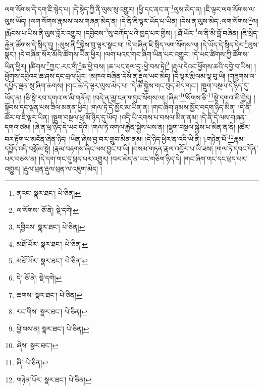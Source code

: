ལག་སོགས་དེ་དག་ཇི་སྙེད་པ། །དེ་སྙེད་ཀྱི་ནི་ལུས་སུ་འགྱུར། །ཕྱི་དང་ནང་ན་\footnote{ནའང་  སྣར་ཐང་།  པེ་ཅིན། }ལུས་མེད་ན། །ཇི་ལྟར་ལག་སོགས་ལ་ལུས་ཡོད། །ལག་སོགས་རྣམས་ལས་གཞན་མེད་ན། །དེ་ནི་ཇི་ལྟར་ཡོད་པ་ཡིན། །དེས་ན་ལུས་མེད་:ལག་སོགས་\footnote{ལ་སོགས་  ཅོ་ནེ།  སྡེ་དགེ། }ལ། །རྨོངས་པ་ཡིས་ནི་ལུས་བློར་འགྱུར། །དབྱིབས་\footnote{དབྱིངས་  སྣར་ཐང་།  པེ་ཅིན། }སུ་བཀོད་པའི་ཁྱད་པར་གྱིས། །:ཐོ་ཡོར་\footnote{མཐོ་ཡོར་  སྣར་ཐང་།  པེ་ཅིན། }ལ་ནི་མི་བློ་བཞིན། །ཇི་སྲིད་རྐྱེན་ཚོགས་དེ་སྲིད་དུ། །:ལུས་ནི་\footnote{མཐོ་ཡོར་  སྣར་ཐང་།  པེ་ཅིན། }སྐྱེས་བུ་ལྟར་སྣང་བ། །དེ་བཞིན་ཇི་སྲིད་ལག་སོགས་ལ། །དེ་ཡོད་དེ་སྲིད་དེར་\footnote{དེ་  ཅོ་ནེ།  སྡེ་དགེ། }ལུས་སྣང་། །དེ་བཞིན་སོར་མོའི་ཚོགས་ཡིན་ཕྱིར། །ལག་པའང་གང་ཞིག་ཡིན་པར་འགྱུར། །དེ་ཡང་ཚིགས་ཀྱི་ཚོགས་ཡིན་ཕྱིར། །ཚིགས་\footnote{ཆགས་  སྣར་ཐང་།  པེ་ཅིན། }ཀྱང་:རང་གི་\footnote{རང་གིས་  སྣར་ཐང་།  པེ་ཅིན། }ཆ་ཕྱེ་བས། །ཆ་ཡང་རྡུལ་དུ་:ཕྱེ་བས་ཏེ།\footnote{ཕྱེ་བས་ན།  སྣར་ཐང་།  པེ་ཅིན། } །རྡུལ་དེའང་ཕྱོགས་ཆའི་དབྱེ་བ་ཡིས། །ཕྱོགས་དབྱེའང་ཆ་ཤས་དང་བྲལ་ཕྱིར། །མཁའ་བཞིན་དེས་ན་རྡུལ་ཡང་མེད། །དེ་ལྟར་རྨི་ལམ་ལྟ་བུ་ཡི། །གཟུགས་ལ་དཔྱོད་ལྡན་སུ་ཞིག་ཆགས། །གང་ཚེ་དེ་ལྟར་ལུས་མེད་པ། །དེ་ཚེ་སྐྱེས་གང་བུད་མེད་གང་། །སྡུག་བསྔལ་དེ་ཉིད་དུ་ཡོད་ན། །ཅི་སྟེ་རབ་དགའ་ལ་མི་གནོད། །བདེ་ན་མྱ་ངན་གདུང་སོགས་ལ། །ཞིམ་\footnote{ཞེས་  སྣར་ཐང་། }སོགས་ཅི་\footnote{ཞི་  པེ་ཅིན། }སྟེ་དགའ་མི་བྱེད། །སྟོབས་དང་ལྡན་པས་ཟིལ་མནན་ཕྱིར། །གལ་ཏེ་དེ་མྱོང་མ་ཡིན་ན། །གང་ཞིག་ཉམས་མྱོང་བདག་ཉིད་མིན། །དེ་ནི་ཚོར་བ་ཇི་ལྟར་ཡིན། །སྡུག་བསྔལ་ཕྲ་མོ་ཉིད་དུ་ཡོད། །འདི་ཡི་རགས་པ་བསལ་མིན་ནམ། །དེ་ནི་དེ་ལས་གཞན་དགའ་ཙམ། །ཞེ་ན་ཕྲ་ཉིད་དེ་ཡང་དེའི། །གལ་ཏེ་འགལ་རྐྱེན་སྐྱེས་པས་ན། །སྡུག་བསྔལ་སྐྱེས་པ་མིན་ན་ནི། །ཚོར་བར་རྟོག་པ་མངོན་ཞེན་ཉིད། །ཡིན་ཞེས་བྱ་བར་གྲུབ་མིན་ནམ། །དེ་ཉིད་ཕྱིར་ན་འདི་ཡི་ནི། །:གཉེན་པོ་\footnote{གཉེན་པོར་  སྣར་ཐང་།  པེ་ཅིན། }རྣམ་དཔྱོད་འདི་བསྒོམ་སྟེ། །རྣམ་བརྟགས་ཞིང་ལས་བྱུང་བ་ཡི། །བསམ་གཏན་རྣལ་འབྱོར་པ་ཡི་ཟས། །གལ་ཏེ་དབང་དོན་པར་བཅས་ན། །དེ་དག་གང་དུ་ཕྲད་པར་འགྱུར། །བར་མེད་ན་ཡང་གཅིག་ཉིད་དེ། །གང་ཞིག་གང་དང་ཕྲད་པར་འགྱུར། །རྡུལ་ཕྲན་རྡུལ་ཕྲན་ལ་འཇུག་མེད། །
